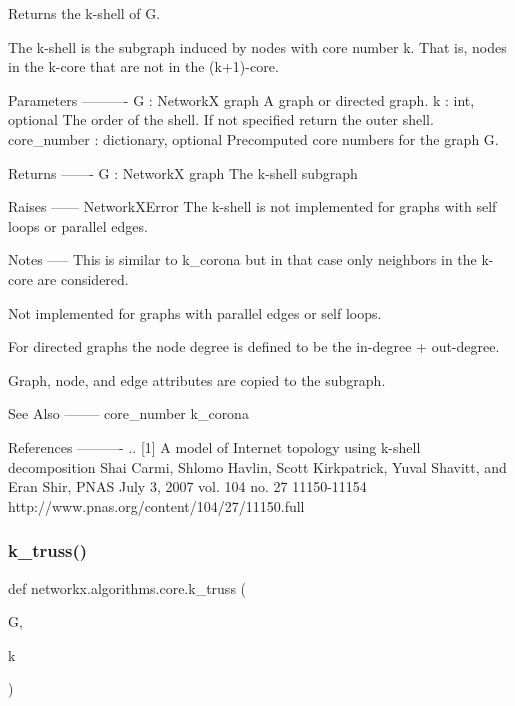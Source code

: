 \begin{DoxyVerb}Returns the k-shell of G.

The k-shell is the subgraph induced by nodes with core number k.
That is, nodes in the k-core that are not in the (k+1)-core.

Parameters
----------
G : NetworkX graph
  A graph or directed graph.
k : int, optional
  The order of the shell. If not specified return the outer shell.
core_number : dictionary, optional
  Precomputed core numbers for the graph G.


Returns
-------
G : NetworkX graph
   The k-shell subgraph

Raises
------
NetworkXError
    The k-shell is not implemented for graphs with self loops
    or parallel edges.

Notes
-----
This is similar to k_corona but in that case only neighbors in the
k-core are considered.

Not implemented for graphs with parallel edges or self loops.

For directed graphs the node degree is defined to be the
in-degree + out-degree.

Graph, node, and edge attributes are copied to the subgraph.

See Also
--------
core_number
k_corona


References
----------
.. [1] A model of Internet topology using k-shell decomposition
   Shai Carmi, Shlomo Havlin, Scott Kirkpatrick, Yuval Shavitt,
   and Eran Shir, PNAS  July 3, 2007   vol. 104  no. 27  11150-11154
   http://www.pnas.org/content/104/27/11150.full
\end{DoxyVerb}
 \mbox{\label{namespacenetworkx_1_1algorithms_1_1core_a638bbecff30a1284a4a52aff274d6773}} 
\subsubsection{\texorpdfstring{k\+\_\+truss()}{k\_truss()}}
{\footnotesize\ttfamily def networkx.\+algorithms.\+core.\+k\+\_\+truss (\begin{DoxyParamCaption}\item[{}]{G,  }\item[{}]{k }\end{DoxyParamCaption})}

